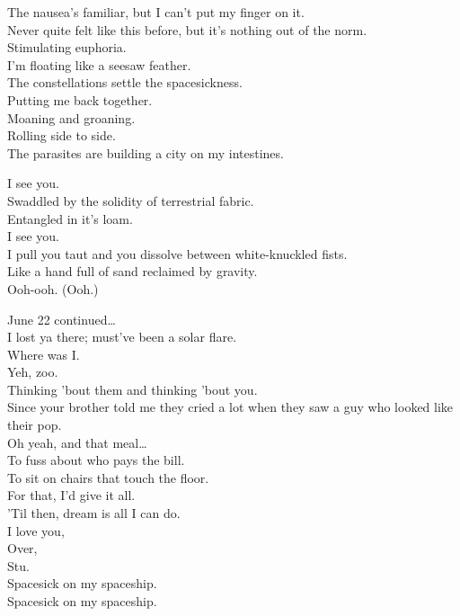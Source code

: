 The nausea's familiar, but I can't put my finger on it. \\
Never quite felt like this before, but it's nothing out of the norm. \\
Stimulating euphoria. \\
I'm floating like a seesaw feather. \\
The constellations settle the spacesickness. \\
Putting me back together. \\

Moaning and groaning. \\
Rolling side to side. \\
The parasites are building a city on my intestines. \\


I see you. \\
Swaddled by the solidity of terrestrial fabric. \\
Entangled in it's loam. \\
I see you. \\
I pull you taut and you dissolve between white-knuckled fists. \\
Like a hand full of sand reclaimed by gravity. \\
Ooh-ooh. (Ooh.) \\


June 22 continued… \\
I lost ya there; must've been a solar flare. \\
Where was I. \\
Yeh, zoo. \\
Thinking 'bout them and thinking 'bout you. \\
Since your brother told me they cried a lot when they saw a guy who looked like their pop. \\
Oh yeah, and that meal… \\
To fuss about who pays the bill. \\
To sit on chairs that touch the floor. \\
For that, I'd give it all. \\
'Til then, dream is all I can do. \\
I love you, \\
Over, \\
Stu. \\

Spacesick on my spaceship. \\
Spacesick on my spaceship. \\

